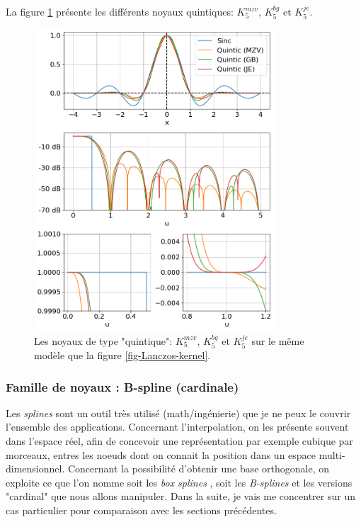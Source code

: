 \documentclass[11pt,twoside]{article}
\begin{document}
La figure \ref{fig-quintic-kernels} présente les différents noyaux quintiques: $K^{mzv}_5$, $K^{bg}_5$ et $K^{je}_5$. 
\begin{figure}
\centering
\includegraphics[width=0.8\textwidth]{fig10.png}
\caption{Les noyaux de type "quintique": $K^{mzv}_5$, $K^{bg}_5$ et $K^{je}_5$  sur le même modèle que la figure \ref{fig-Lanczos-kernel}.}
\label{fig-quintic-kernels}
\end{figure}

%
\subsubsection{Famille de noyaux : B-spline (cardinale)}
%
Les \textit{splines} sont un outil très utilisé (math/ingénierie) que je ne peux le couvrir l'ensemble des applications. Concernant l'interpolation, on les présente souvent dans l'espace réel, afin de concevoir une représentation par exemple cubique par morceaux, entres les noeuds dont on connait la position dans un espace multi-dimensionnel. Concernant la possibilité d'obtenir une base orthogonale, on exploite ce que l'on nomme soit les \textit{box splines} \cite{10.5555/1525499}, soit les \textit{B-splines} et les versions "cardinal" \cite{Unser1993a} que nous allons manipuler.  Dans la suite, je vais me concentrer sur un cas particulier pour comparaison avec les sections précédentes. 
\end{document}

